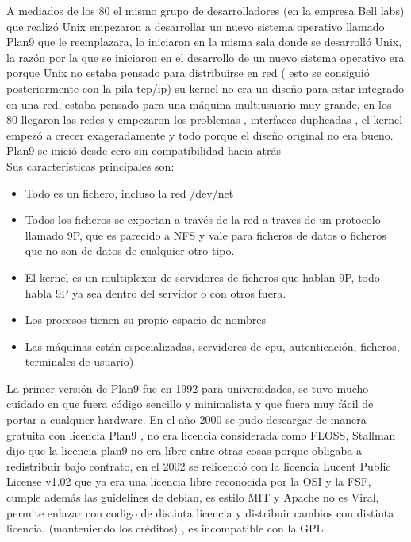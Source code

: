 \documentclass[a4paper,oneside,11pt]{article}
\begin{document}
A mediados de los 80 el mismo grupo de desarrolladores (en la empresa Bell labs) que realiz\'o Unix empezaron a desarrollar un nuevo sistema operativo llamado
Plan9 que le reemplazara, lo iniciaron en la misma sala donde se desarroll\'o Unix, la raz\'on por la que se iniciaron en el desarrollo
de un nuevo sistema operativo era porque Unix no estaba pensado para distribuirse en red ( esto se consigui\'o posteriormente con la pila tcp/ip)
su kernel no era un diseño para estar integrado en una red, estaba pensado para una m\'aquina
multiusuario muy grande, en los 80 llegaron las redes y empezaron los problemas , interfaces duplicadas , el kernel empez\'o a crecer exageradamente y todo porque el 
diseño original no era bueno.
\\
Plan9 se inici\'o desde cero sin compatibilidad hacia atr\'as
\\
Sus caracter\'isticas principales son:

\begin{itemize}  
	\item Todo es un fichero, incluso la red /dev/net
	\item Todos los ficheros se exportan a trav\'es de la red a traves de un protocolo llamado 9P, que es parecido
	 a NFS y vale para ficheros de datos o ficheros que no son de datos de cualquier otro tipo. 
	\item El kernel es un multiplexor de servidores  de ficheros que hablan  9P, todo habla 9P ya sea dentro del
	 servidor o con otros fuera.
	\item Los procesos tienen su propio espacio de nombres
	\item Las m\'aquinas están especializadas, servidores de cpu, autenticaci\'on, ficheros, terminales de usuario)
\end{itemize}

La primer versi\'on de Plan9 fue en 1992 para universidades, se tuvo mucho cuidado en que fuera c\'odigo sencillo
y minimalista y que fuera muy f\'acil de portar a cualquier hardware.
En el año 2000 se pudo descargar de manera gratuita con licencia Plan9 , no era licencia considerada
como FLOSS, Stallman dijo que la licencia plan9 no era libre entre otras cosas porque obligaba
a redistribuir bajo contrato, en el 2002 se relicenci\'o con la licencia Lucent Public License v1.02 que ya era 
una licencia libre reconocida por la OSI y la FSF, cumple adem\'as las guidelines de debian,
 es estilo MIT y Apache no es Viral, permite enlazar con codigo de
 distinta licencia y distribuir cambios con distinta licencia. (manteniendo los cr\'editos) ,
  es incompatible con la GPL.
\end{document}
